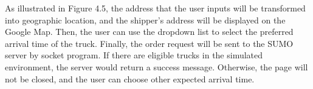 \documentclass[12pt]{ksthesis}
\begin{document}
\begin{thesis}
{As illustrated in Figure 4.5, the address that the user inputs will be transformed into geographic location, and the shipper’s address will be displayed on the Google Map. Then, the user can use the dropdown list to select the preferred arrival time of the truck. 
Finally, the order request will be sent to the SUMO server by socket program. If there are eligible trucks in the simulated environment, the server would return a success message. Otherwise, the page will not be closed, and the user can choose other expected arrival time.  

\begin{figure}[H]
\centering  %


\end{figure}}
\end{thesis}
\end{document}

